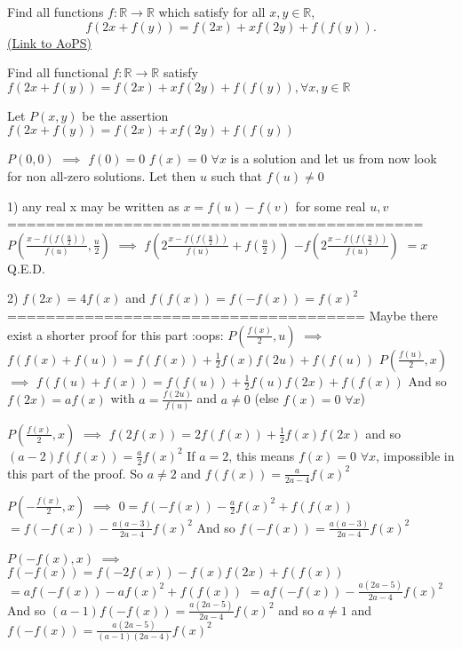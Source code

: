 \begin{problem}
	Find all functions $f: \mathbb R \to \mathbb R$ which satisfy for all $x, y \in \mathbb R$,
\[f(2x+f(y))=f(2x)+xf(2y)+f(f(y)).\]
	\flushright \href{https://artofproblemsolving.com/community/c6h391863}{(Link to AoPS)}
\end{problem}



\begin{solution}
	\begin{tcolorbox}Find all functional $f:\mathbb{R}\to\mathbb{R}$ satisfy
$f(2x+f(y))=f(2x)+xf(2y)+f(f(y)),\forall x,y\in\mathbb{R} $\end{tcolorbox}
Let $P(x,y)$ be the assertion $f(2x+f(y))=f(2x)+xf(2y)+f(f(y))$

$P(0,0)$ $\implies$ $f(0)=0$
$f(x)=0$ $\forall x$ is a solution and let us from now look for non all-zero solutions. Let then $u$ such that $f(u)\ne 0$

1) any real x may be written as $x=f(u)-f(v)$ for some real $u,v$
===========================================
$P(\frac{x-f(f(\frac u2))}{f(u)},\frac u2)$ $\implies$ $f(2\frac{x-f(f(\frac u2))}{f(u)}+f(\frac u2))$ $-f(2\frac{x-f(f(\frac u2))}{f(u)})$ $=x$
Q.E.D.

2) $f(2x)=4f(x)$ and $f(f(x))=f(-f(x))=f(x)^2$
=====================================
Maybe there exist a shorter proof for this part :oops:
$P(\frac{f(x)}2,u)$ $\implies$ $f(f(x)+f(u))=f(f(x))+\frac 12f(x)f(2u)+f(f(u))$
$P(\frac{f(u)}2,x)$ $\implies$ $f(f(u)+f(x))=f(f(u))+\frac 12f(u)f(2x)+f(f(x))$
And so $f(2x)=af(x)$ with $a=\frac{f(2u)}{f(u)}$ and $a\ne 0$ (else $f(x)=0$ $\forall x$)

$P(\frac{f(x)}2,x)$ $\implies$ $f(2f(x))=2f(f(x))+\frac 12f(x)f(2x)$ and so $(a-2)f(f(x))=\frac a2f(x)^2$
If $a=2$, this means $f(x)=0$ $\forall x$, impossible in this part of the proof.
So $a\ne 2$ and $f(f(x))=\frac a{2a-4}f(x)^2$

$P(-\frac{f(x)}2,x)$ $\implies$ $0=f(-f(x))-\frac a2f(x)^2+f(f(x))$ $=f(-f(x))-\frac{a(a-3)}{2a-4}f(x)^2$
And so $f(-f(x))=\frac{a(a-3)}{2a-4}f(x)^2$

$P(-f(x),x)$ $\implies$ $f(-f(x))=f(-2f(x))-f(x)f(2x)+f(f(x))$ $=af(-f(x))-af(x)^2+f(f(x))$ $=af(-f(x))-\frac{a(2a-5)}{2a-4}f(x)^2$
And so $(a-1)f(-f(x))=\frac{a(2a-5)}{2a-4}f(x)^2$ and so $a\ne 1$ and $f(-f(x))=\frac{a(2a-5)}{(a-1)(2a-4)}f(x)^2$


\end{solution}
